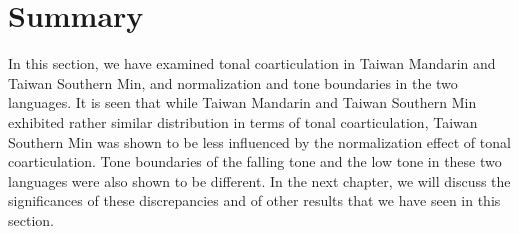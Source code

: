 \section{Summary}
In this section, we have examined tonal coarticulation in Taiwan Mandarin and Taiwan Southern Min, and normalization and tone boundaries in the two languages. It is seen that while Taiwan Mandarin and Taiwan Southern Min exhibited rather similar distribution in terms of tonal coarticulation, Taiwan Southern Min was shown to be less influenced by the normalization effect of tonal coarticulation. Tone boundaries of the falling tone and the low tone in these two languages were also shown to be different. In the next chapter, we will discuss the significances of these discrepancies and of other results that we have seen in this section.